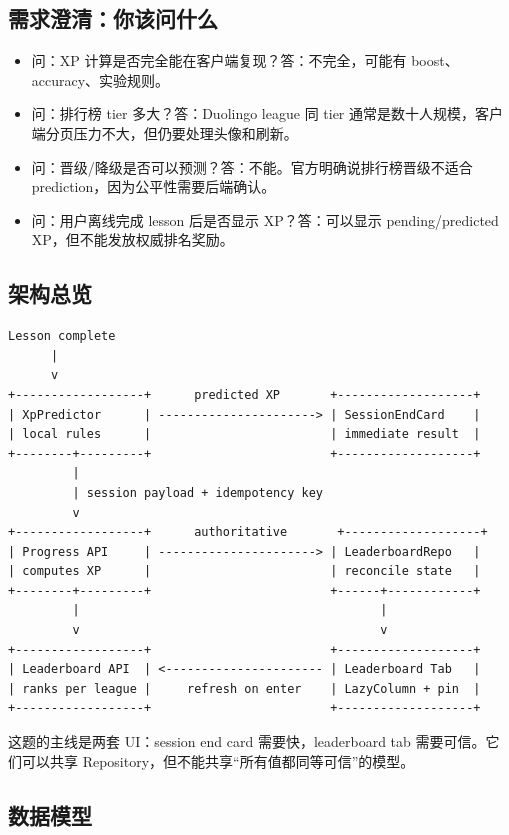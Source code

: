 \subsection{需求澄清：你该问什么}

\begin{itemize}
  \item 问：XP 计算是否完全能在客户端复现？答：不完全，可能有 boost、accuracy、实验规则。
  \item 问：排行榜 tier 多大？答：\srcinferred Duolingo league 同 tier 通常是数十人规模，客户端分页压力不大，但仍要处理头像和刷新。
  \item 问：晋级/降级是否可以预测？答：不能。\srcofficial 官方明确说排行榜晋级不适合 prediction，因为公平性需要后端确认。
  \item 问：用户离线完成 lesson 后是否显示 XP？答：可以显示 pending/predicted XP，但不能发放权威排名奖励。
\end{itemize}

\subsection{架构总览}

\begin{lstlisting}
Lesson complete
      |
      v
+------------------+      predicted XP       +-------------------+
| XpPredictor      | ----------------------> | SessionEndCard    |
| local rules      |                         | immediate result  |
+--------+---------+                         +-------------------+
         |
         | session payload + idempotency key
         v
+------------------+      authoritative       +-------------------+
| Progress API     | ----------------------> | LeaderboardRepo   |
| computes XP      |                         | reconcile state   |
+--------+---------+                         +------+------------+
         |                                          |
         v                                          v
+------------------+                         +-------------------+
| Leaderboard API  | <---------------------- | Leaderboard Tab   |
| ranks per league |     refresh on enter    | LazyColumn + pin  |
+------------------+                         +-------------------+
\end{lstlisting}

这题的主线是两套 UI：session end card 需要快，leaderboard tab 需要可信。它们可以共享 Repository，但不能共享“所有值都同等可信”的模型。

\subsection{数据模型}

